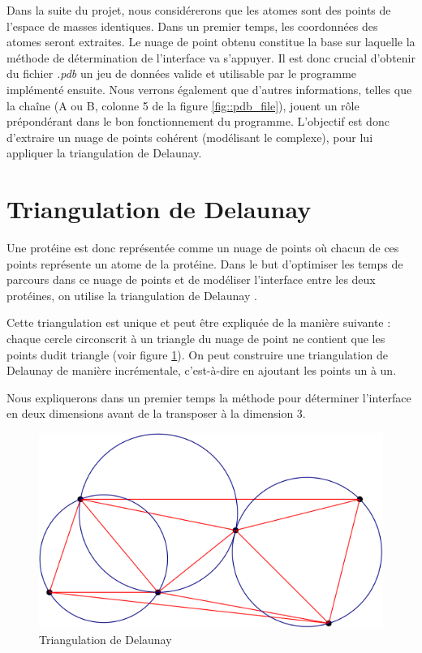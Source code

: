 Dans la suite du projet, nous considérerons que les atomes sont des points de l'espace
de masses identiques. Dans un premier temps, les coordonnées des atomes seront extraites.
Le nuage de point obtenu constitue la base sur laquelle la méthode de détermination
de l'interface va s'appuyer. Il est donc crucial d'obtenir du fichier \textit{.pdb} un jeu
de données valide et utilisable par le programme implémenté ensuite. Nous verrons également
que d'autres informations, telles que la chaîne (A ou B, colonne 5 de la figure
\ref{fig::pdb_file}), jouent un rôle prépondérant dans le bon fonctionnement du
programme. L'objectif est donc d'extraire un nuage de points cohérent (modélisant
le complexe), pour lui appliquer la triangulation de Delaunay.



\section{Triangulation de Delaunay}

Une protéine est donc représentée comme un nuage de points où chacun de ces points
représente un atome de la protéine. Dans le but d'optimiser les temps de parcours dans
ce nuage de points et de modéliser l'interface entre les deux protéines,
 on utilise la triangulation de Delaunay \cite{Triangulation}.

Cette triangulation est unique et peut être expliquée de la manière suivante :
chaque cercle circonscrit à un triangle du nuage de point ne contient que les points
dudit triangle (voir figure \ref{fig::explication_delaunay}).
On peut construire une triangulation de Delaunay de manière incrémentale, c'est-à-dire
en ajoutant les points un à un.

 Nous expliquerons dans un premier
 temps la méthode pour déterminer l'interface en deux dimensions avant de la transposer à la
 dimension 3.

\begin{figure}[ht]
\centering
  \includegraphics[width=\textwidth]{figures/explication_delaunay.png}
  \caption{Triangulation de Delaunay}
  \label{fig::explication_delaunay}
\end{figure}

